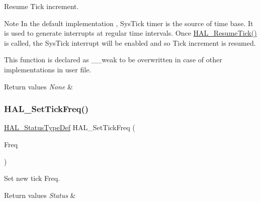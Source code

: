 Resume Tick increment. 

\begin{DoxyNote}{Note}
In the default implementation , Sys\+Tick timer is the source of time base. It is used to generate interrupts at regular time intervals. Once \mbox{\hyperlink{group___h_a_l___exported___functions___group2_gac3fa17aa85e357e3f1af56ad110d2e97}{H\+A\+L\+\_\+\+Resume\+Tick()}} is called, the Sys\+Tick interrupt will be enabled and so Tick increment is resumed. 

This function is declared as \+\_\+\+\_\+weak to be overwritten in case of other implementations in user file. 
\end{DoxyNote}

\begin{DoxyRetVals}{Return values}
{\em None} & \\
\hline
\end{DoxyRetVals}
\mbox{\label{group___h_a_l___exported___functions___group2_ga47f2dd240b2aed823a76b11496f37690}} 
\subsubsection{\texorpdfstring{HAL\_SetTickFreq()}{HAL\_SetTickFreq()}}
{\footnotesize\ttfamily \mbox{\hyperlink{stm32f7xx__hal__def_8h_a63c0679d1cb8b8c684fbb0632743478f}{H\+A\+L\+\_\+\+Status\+Type\+Def}} H\+A\+L\+\_\+\+Set\+Tick\+Freq (\begin{DoxyParamCaption}\item[{H\+A\+L\+\_\+\+Tick\+Freq\+Type\+Def}]{Freq }\end{DoxyParamCaption})}



Set new tick Freq. 


\begin{DoxyRetVals}{Return values}
{\em Status} & \\
\hline
\end{DoxyRetVals}
\mbox{\label{group___h_a_l___exported___functions___group2_ga84ae4b045c45d49d96b2b02e2dc516b6}} 
